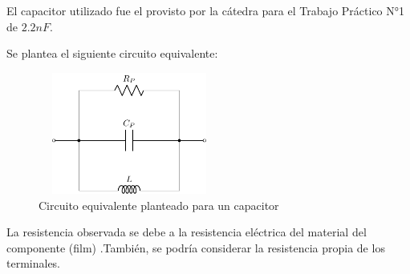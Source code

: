 El capacitor utilizado fue el provisto por la cátedra para el Trabajo Práctico N°1 de $2.2nF$.
\par \par

Se plantea el siguiente circuito equivalente:

\begin{figure}[H]
\centering
\includegraphics[width=6cm,height=4cm]{Ejercicio_1(Germo)/Circuitos/circuito_equivalente_capacitor_todoparalelo.pdf}
\caption{Circuito equivalente planteado para un capacitor}
\label{fig:circuito_equivalente_capacitor_todoparalelo}
\end{figure}
La resistencia observada se debe a la resistencia eléctrica del material del componente (film) .También, se podría considerar la resistencia propia de los terminales. \par

